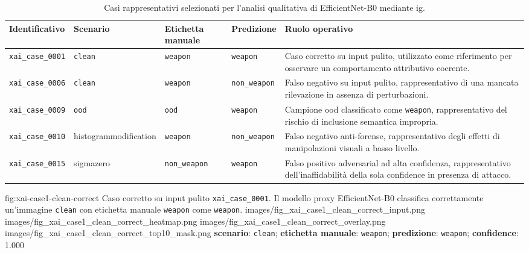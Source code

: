 \begin{table}[htbp]
\centering
\small
\renewcommand{\arraystretch}{1.15}
\begin{tabular}{p{} p{} p{} p{} p{}}
\toprule
\textbf{Identificativo} &
\textbf{Scenario} &
\textbf{Etichetta manuale} &
\textbf{Predizione} &
\textbf{Ruolo operativo} \\
\midrule

\texttt{xai\_case\_0001} &
\texttt{clean} &
\texttt{weapon} &
\texttt{weapon} &
Caso corretto su input pulito, utilizzato come riferimento per osservare un comportamento attributivo coerente. \\

\texttt{xai\_case\_0006} &
\texttt{clean} &
\texttt{weapon} &
\texttt{non\_weapon} &
Falso negativo su input pulito, rappresentativo di una mancata rilevazione in assenza di perturbazioni. \\

\texttt{xai\_case\_0009} &
\texttt{ood} &
\texttt{ood} &
\texttt{weapon} &
Campione \gls{ood} classificato come \texttt{weapon}, rappresentativo del rischio di inclusione semantica impropria. \\

\texttt{xai\_case\_0010} &
\gls{histogrammodification} &
\texttt{weapon} &
\texttt{non\_weapon} &
Falso negativo anti-forense, rappresentativo degli effetti di manipolazioni visuali a basso livello. \\

\texttt{xai\_case\_0015} &
\gls{sigmazero} &
\texttt{non\_weapon} &
\texttt{weapon} &
Falso positivo adversarial ad alta confidenza, rappresentativo dell'inaffidabilità della sola confidence in presenza di attacco. \\

\bottomrule
\end{tabular}
\caption{Casi rappresentativi selezionati per l'analisi qualitativa di EfficientNet-B0 mediante \gls{ig}.}
\label{tab:results-xai-cases}
\end{table}


\XAIcaseFigureMaskGrid
{fig:xai-case1-clean-correct}
{Caso corretto su input pulito \texttt{xai\_case\_0001}. Il modello proxy
EfficientNet-B0 classifica correttamente un'immagine \texttt{clean} con etichetta
manuale \texttt{weapon} come \texttt{weapon}.}
{images/fig_xai_case1_clean_correct_input.png}
{images/fig_xai_case1_clean_correct_heatmap.png}
{images/fig_xai_case1_clean_correct_overlay.png}
{images/fig_xai_case1_clean_correct_top10_mask.png}
{\textbf{scenario}: \texttt{clean};
 \textbf{etichetta manuale}: \texttt{weapon};
 \textbf{predizione}: \texttt{weapon};
 \textbf{confidence}: 1.000}

